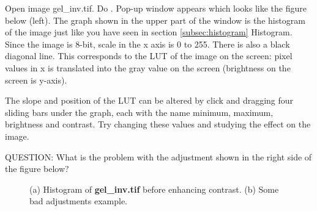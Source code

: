 \begin{indentexercise}{1}
Open image gel\_inv.tif. Do . 
Pop-up window appears which looks like the
figure below (left). The graph shown in the upper part of the window is 
the
histogram of the image just like you have seen in section \ref{subsec:histogram} Histogram. 
Since the image is 8-bit, scale in the x axis is 0 to 255.
There is also a black diagonal line. This corresponds to the LUT of the
image on the screen: pixel values in x is translated into the gray
value on the screen (brightness on the screen is y-axis). 

The slope and position of the LUT can be altered by click and dragging
four sliding bars under the graph, each with the name minimum, maximum,
brightness and contrast. Try changing these values and studying the
effect on the image. 

QUESTION: What is the problem with the adjustment shown in the
right side of the figure below?

\begin{figure}[htbp]
 \centering
 \caption{ (a) Histogram of \textbf{gel\_inv.tif} before enhancing contrast. (b) Some bad adjustments example. }
 \label{fig:quizEnhanceContrast}
\end{figure} 

\end{indentexercise}

